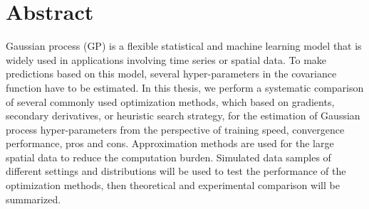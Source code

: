 \chapter*{Abstract}

Gaussian process (GP) is a flexible statistical and machine learning model that is widely used in applications involving time series or spatial data. To make predictions based on this model, several hyper-parameters in the covariance function have to be estimated. In this thesis, we perform a systematic comparison of several commonly used optimization methods, which based on gradients, secondary derivatives, or heuristic search strategy, for the estimation of Gaussian process hyper-parameters from the perspective of training speed, convergence performance, pros and cons. Approximation methods are used for the large spatial data to reduce the computation burden. Simulated data samples of different settings and distributions will be used to test the performance of the optimization methods, then theoretical and experimental comparison will be summarized. %

